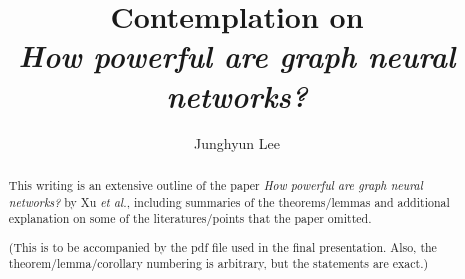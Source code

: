 \documentclass[a4paper, twoside]{report}
\title{Contemplation on \\
{\it How powerful are graph neural networks?}}
\author{Junghyun Lee}
\theoremstyle{break}
\begin{document}


\begin{abstract}
This writing is an extensive outline of the paper {\it How powerful are graph neural networks?} by Xu {\it et al.}, including summaries of the theorems/lemmas and additional explanation on some of the literatures/points that the paper omitted.

(This is to be accompanied by the pdf file used in the final presentation. Also, the theorem/lemma/corollary numbering is arbitrary, but the statements are exact.)
\end{abstract}

\tableofcontents
\listoffigures








\printbibliography
{}
\end{document}
